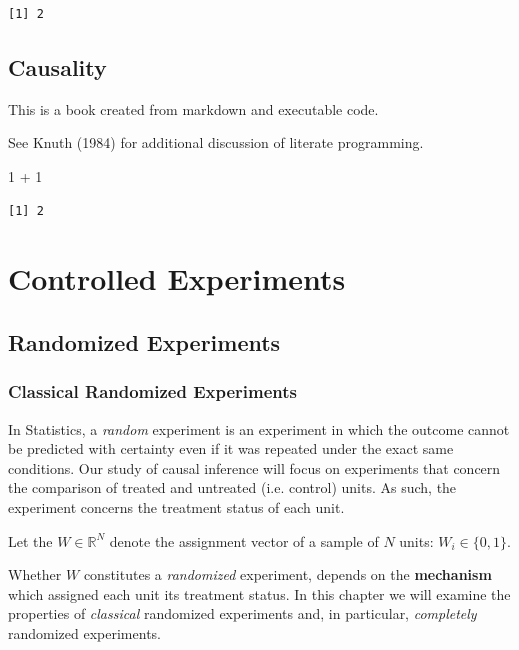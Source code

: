 \documentclass[
  letterpaper,
  DIV=11,
  numbers=noendperiod]{scrreprt}
\newenvironment{Shaded}{\begin{snugshade}}{\end{snugshade}}
\newcommand{\DecValTok}[1]{\textcolor[rgb]{0.68,0.00,0.00}{#1}}
\newcommand{\SpecialCharTok}[1]{\textcolor[rgb]{0.37,0.37,0.37}{#1}}
\theoremstyle{definition}
\theoremstyle{remark}
\begin{document}
\begin{verbatim}
[1] 2
\end{verbatim}


\chapter{Causality}\label{causality}

This is a book created from markdown and executable code.

See Knuth (1984) for additional discussion of literate programming.

\begin{Shaded}
\begin{Highlighting}[]
\DecValTok{1} \SpecialCharTok{+} \DecValTok{1}
\end{Highlighting}
\end{Shaded}

\begin{verbatim}
[1] 2
\end{verbatim}

\part{Controlled Experiments}

\chapter{Randomized Experiments}\label{sec-classical}

\section{Classical Randomized
Experiments}\label{classical-randomized-experiments}

In Statistics, a \emph{random} experiment is an experiment in which the
outcome cannot be predicted with certainty even if it was repeated under
the exact same conditions. Our study of causal inference will focus on
experiments that concern the comparison of treated and untreated (i.e.
control) units. As such, the experiment concerns the treatment status of
each unit.

Let the \(W\in \mathbb{R}^N\) denote the assignment vector of a sample
of \(N\) units: \(W_i \in \{0,1\}\).

Whether \(W\) constitutes a \emph{randomized} experiment, depends on the
\textbf{mechanism} which assigned each unit its treatment status. In
this chapter we will examine the properties of \emph{classical}
randomized experiments and, in particular, \emph{completely} randomized
experiments.
\end{document}

